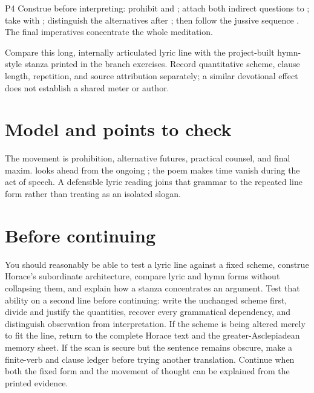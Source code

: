\begin{courseunit}{P4}
Construe before interpreting: prohibit  and
; attach both indirect questions to ; take
 with ; distinguish the alternatives after
; then follow the jussive sequence .
The final imperatives concentrate the whole meditation.

Compare this long, internally articulated lyric line with the project-built
hymn-style stanza printed in the branch exercises. Record quantitative
scheme, clause length, repetition, and source attribution separately; a
similar devotional effect does not establish a shared meter or author.

\ifsolutions
\section{Model and points to check}
The movement is prohibition, alternative futures, practical counsel, and final
maxim.  looks ahead from the ongoing ; the poem
makes time vanish during the act of speech. A defensible lyric reading joins
that grammar to the repeated line form rather than treating
 as an isolated slogan.
\else
\section{Before continuing}
You should reasonably be able to test a lyric line against a fixed scheme,
construe Horace's subordinate architecture, compare lyric and hymn forms
without collapsing them, and explain how a stanza concentrates an argument.
Test that ability on a second line before continuing: write the unchanged
scheme first, divide and justify the quantities, recover every grammatical
dependency, and distinguish observation from interpretation. If the scheme is
being altered merely to fit the line, return to the complete Horace text and
the greater-Asclepiadean memory sheet. If the scan is secure but the sentence
remains obscure, make a finite-verb and clause ledger before trying another
translation. Continue when both the fixed form and the movement of thought can
be explained from the printed evidence.
\fi
\end{courseunit}

